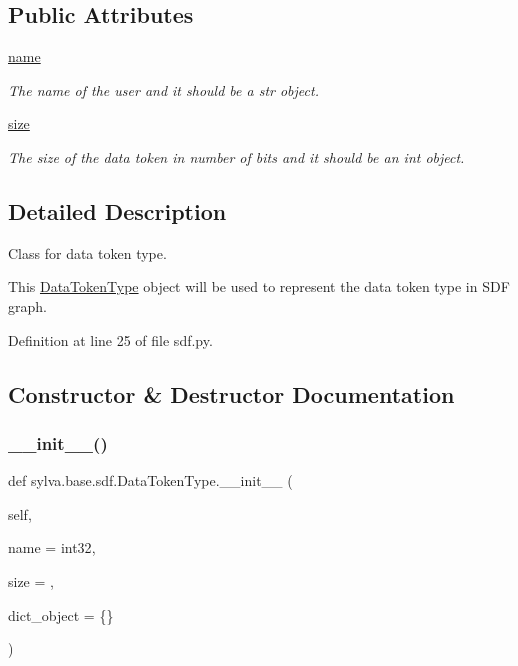 \subsection*{Public Attributes}
\begin{DoxyCompactItemize}
\item 
\hyperlink{classsylva_1_1base_1_1sdf_1_1_data_token_type_a64214bba14fcba747fd608caef007924}{name}
\begin{DoxyCompactList}\small\item\em The name of the user and it should be a str object. \end{DoxyCompactList}\item 
\hyperlink{classsylva_1_1base_1_1sdf_1_1_data_token_type_abf397c07db4eced64bf773de13fcbbf0}{size}
\begin{DoxyCompactList}\small\item\em The size of the data token in number of bits and it should be an int object. \end{DoxyCompactList}\end{DoxyCompactItemize}


\subsection{Detailed Description}
Class for data token type. 

This \hyperlink{classsylva_1_1base_1_1sdf_1_1_data_token_type}{Data\+Token\+Type} object will be used to represent the data token type in S\+DF graph. 

Definition at line 25 of file sdf.\+py.



\subsection{Constructor \& Destructor Documentation}
\mbox{\label{classsylva_1_1base_1_1sdf_1_1_data_token_type_ae0e89b38521c627297b30d5e7268a90b}} 
\subsubsection{\texorpdfstring{\+\_\+\+\_\+init\+\_\+\+\_\+()}{\_\_init\_\_()}}
{\footnotesize\ttfamily def sylva.\+base.\+sdf.\+Data\+Token\+Type.\+\_\+\+\_\+init\+\_\+\+\_\+ (\begin{DoxyParamCaption}\item[{}]{self,  }\item[{}]{name = {\ttfamily \textquotesingle{}int32\textquotesingle{}},  }\item[{}]{size = {},  }\item[{}]{dict\+\_\+object = {\ttfamily \{\}} }\end{DoxyParamCaption})}



